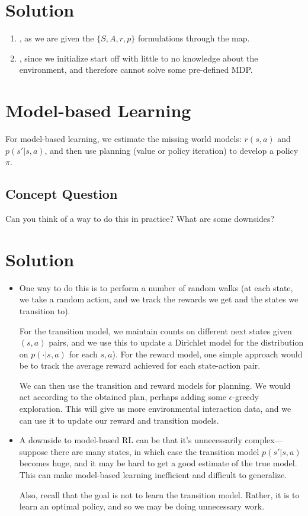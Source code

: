 \documentclass[11pt, letterpaper]{article}
\newenvironment{solution}
  {\color{blue}\section*{Solution}}
{}
\begin{document}
\begin{solution}
\begin{enumerate}
    \item {}, as we are given the $\{S, A, r, p\}$ formulations through the map.
    \item {}, since we initialize start off with little to no knowledge about the environment, and therefore cannot solve some pre-defined MDP.
\end{enumerate}
\end{solution}

\section{Model-based Learning}

For model-based learning, we estimate the missing world models: $r(s, a)$ and $p(s'|s, a)$, and then use planning (value or policy iteration) to develop a policy $\pi$. 

\subsection{Concept Question}

Can you think of a way to do this in practice? What are some
downsides?

\begin{solution}
\begin{itemize}
    \item  One way to do this is to perform a number of random walks (at
  each state, we take a random action, and we track the rewards we get
  and the states we transition to). 
  
  For the transition model, we maintain counts on different next states
  given $(s,a)$ pairs, and we use this to update a Dirichlet model for
  the distribution on $p(\cdot|s,a)$ for each $s,a$). For the reward model,
  one simple approach would be to track the average reward achieved
  for each state-action pair.

  We can then use the transition and reward models for planning. We would act according to the obtained plan, perhaps adding some $\epsilon$-greedy exploration. This will give us more environmental interaction data, and we can use it to update our reward and transition models.
\item A downside to model-based RL can be that
  it's unnecessarily complex--- suppose there are many states, in
  which case the transition model $p(s'|s,a)$ becomes huge, and it may
  be hard to get a good estimate of the true model.
This can make model-based learning inefficient and 
difficult to generalize.

Also, recall that  the goal is not to learn the
  transition model. Rather,  it is to learn an optimal policy, and so we may be
  doing unnecessary work.
\end{itemize} 
\end{solution}
\end{document}
